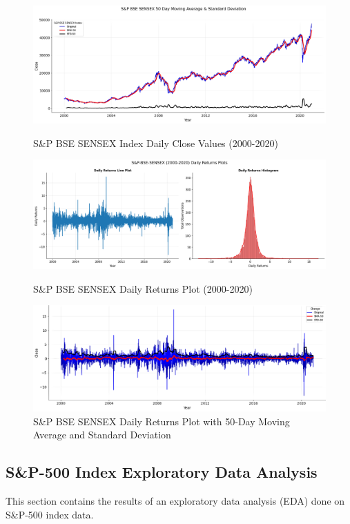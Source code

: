 \documentclass[conference]{IEEEtran}
\begin{document}
\begin{figure}[htbp]
    \centering
	\includegraphics[scale = 1.5, width = 0.50 \textwidth]{images/SENSEX-Line-Plot.png}
	\vspace{-0.3in}
	\caption{S\&P BSE SENSEX Index Daily Close Values (2000-2020)}
	\label{fig: s_and_p_bse_sensex_line_plot}
	\vspace{0.1in}
	\includegraphics[scale = 1.5, width = 0.50 \textwidth]{images/SENSEX 2000-2020 Change Plot.png}
	\vspace{-0.3in}
	\caption{S\&P BSE SENSEX Daily Returns Plot (2000-2020)}
	\label{fig: s_and_p_bse_sensex_percentage_change_plot_1}
	\vspace{0.1in}
	\includegraphics[scale = 1.5, width = 0.50 \textwidth]{images/BSE SENSEX White Noise Part.png}
	\vspace{-0.3in}
	\caption{S\&P BSE SENSEX Daily Returns Plot with 50-Day Moving Average and Standard Deviation}
	\label{fig: s_and_p_bse_sensex_percentage_change_plot_2}
\end{figure}

\subsection{S\&P-500 Index Exploratory Data Analysis}
This section contains the results of an exploratory data analysis (EDA) done on S\&P-500 index data.
\end{document}
